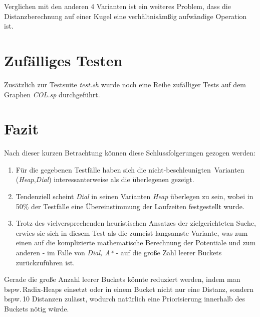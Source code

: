 \documentclass{scrartcl}
\begin{document}
Verglichen mit den anderen 4 Varianten ist ein weiteres Problem, dass die 
Distanzberechnung auf einer Kugel eine verhältnisämßig aufwändige Operation 
ist.

\section{Zufälliges Testen}

Zusätzlich zur Testsuite \emph{test.sh} wurde noch eine Reihe zufälliger
Tests auf dem Graphen \emph{COL.sp} durchgeführt.

\section{Fazit}

Nach dieser kurzen Betrachtung können diese Schlussfolgerungen gezogen werden:
\begin{enumerate}
  \item Für die gegebenen Testfälle haben sich die 
        \glqq nicht-beschleunigten\grqq\ Varianten 
        (\emph{Heap},\emph{Dial}) interessanterweise als die überlegenen
        gezeigt.
  \item Tendenziell scheint \emph{Dial} in seinen Varianten \emph{Heap}
        überlegen zu sein, wobei in 50\% der Testfälle eine Übereinstimmung der
        Laufzeiten festgestellt wurde.
  \item Trotz des vielversprechenden heuristischen Ansatzes der zielgerichteten
        Suche, erwies sie sich in diesem Test als die zumeist langsamste 
        Variante, was zum einen auf die komplizierte mathematische Berechnung
        der Potentiale und zum anderen - im Falle von \emph{Dial, A*} - 
        auf die große Zahl leerer Buckets zurückzuführen ist.
\end{enumerate}

Gerade die große Anzahl leerer Buckets könnte reduziert werden, indem man
bspw.\,Radix-Heaps einsetzt oder in einem Bucket nicht nur eine Distanz,
sondern bspw.\,10 Distanzen zulässt, wodurch natürlich eine Priorisierung 
innerhalb des Buckets nötig würde.
\end{document}
